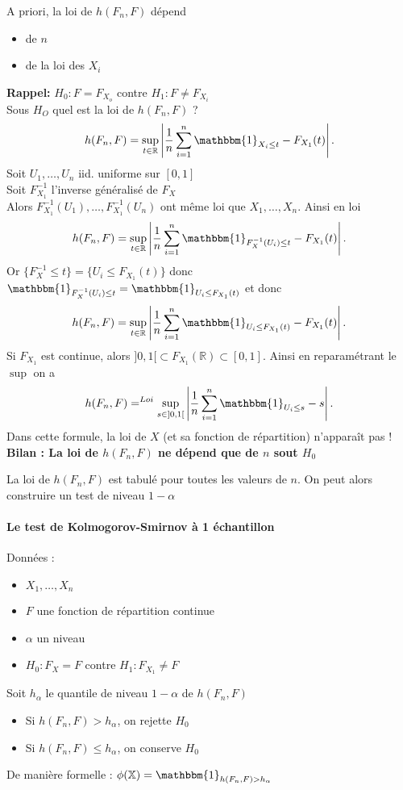 \documentclass{article}
\theoremstyle{plain}%
\theoremstyle{definition}
\theoremstyle{remark}
\begin{document}
A priori, la loi de $ h(F_n, F) $ dépend \begin{itemize}
    \item de $ n $ 
    \item de la loi des $ X_i $ 
\end{itemize}
\textbf{Rappel: } $ H_0: F = F_{X_o} $ contre $ H_1: F \neq F_{X_i} $ \\
Sous $ H_O $ quel est la loi de $ h(F_n, F) $ ? 
\[
    h(F_n, F) = \sup _{t \in \mathbb{R}} \left| \frac{1}{n}\sum_{i=1}^{n}\mathbbm{1}_{X_i \leq t} - F_{X_1}(t)  \right| 
.\]
Soit $ U_1, \dots, U_n $ iid. uniforme sur $ [0,1] $ \\
Soit $ F_{X_1}^{-1} $ l'inverse généralisé de $ F_X $ \\
Alors $ F_{X_1}^{-1}(U_1), \dots, F_{X_1}^{-1}(U_n) $ ont même loi que $ X_1, \dots, X_n $. Ainsi en loi 
\[
    h(F_n, F) = \sup _{t \in \mathbb{R}} \left| \frac{1}{n}\sum_{i=1}^{n}\mathbbm{1}_{F_X^{-1}(U_i) \leq t} - F_{X_1}(t)  \right| 
.\]
Or $ \{F_X^{-1} \leq t\} = \{U_i \leq F_{X_1}(t)\} $ donc $ \mathbbm{1}_{F_X^{-1}(U_i) \leq t} = \mathbbm{1}_{U_i \leq F_{X_1}(t)} $ et donc 
\[
    h(F_n, F) = \sup _{t \in \mathbb{R}} \left| \frac{1}{n}\sum_{i=1}^{n}\mathbbm{1}_{U_i \leq F_{X_1}(t)} - F_{X_1}(t)  \right| 
.\]
Si $ F_{X_1} $ est continue, alors $  ]0,1[ \subset F_{X_1} (\mathbb{R}) \subset [0,1] $. Ainsi en reparamétrant le $ \sup $ on a 
\[
    h(F_n, F) =^{Loi} \sup _{s \in ]0,1[} \left| \frac{1}{n}\sum_{i=1}^{n} \mathbbm{1}_{U_i \leq s} - s \right| 
.\]
Dans cette formule, la loi de $ X $ (et sa fonction de répartition) n'apparaît pas ! \\
\textbf{Bilan : La loi de $ h(F_n, F) $ ne dépend que de $ n $ sout $ H_0 $ }

La loi de $ h(F_n, F) $ est tabulé pour toutes les valeurs de $ n $. On peut alors construire un test de niveau $ 1 - \alpha $

\paragraph{Le test de Kolmogorov-Smirnov à 1 échantillon \\}

Données : \begin{itemize}
    \item $ X_1, \dots, X_n $
    \item $ F $ une fonction de répartition continue
    \item $\alpha$ un niveau
    \item $ H_0: F_X = F $ contre $ H_1: F_{X_1} \neq F $
\end{itemize}
Soit $ h_\alpha $ le quantile de niveau $ 1 - \alpha $ de $ h(F_n, F) $
\begin{itemize}
    \item Si $ h(F_n, F) > h_\alpha $, on rejette $ H_0 $ 
    \item Si $ h(F_n, F) \leq h_\alpha  $, on conserve $ H_0 $ 
\end{itemize}
De manière formelle : $ \phi (\mathbb{X}) = \mathbbm{1}_{h(F_n, F) > h_\alpha } $ 
\end{document}
